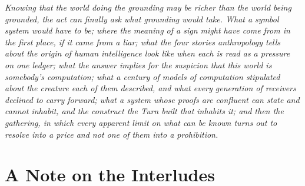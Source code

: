 \documentclass[12pt,openright,twoside]{book}
\theoremstyle{remark}
\theoremstyle{plain}
\theoremstyle{remark}
\theoremstyle{plain}
\theoremstyle{plain}
\begin{document}
\vspace{1em}
\begin{mdframed}[backgroundcolor=remarkgray, linecolor=gray!60,
                 linewidth=1pt, topline=false, rightline=false,
                 bottomline=false]
\small\itshape
Knowing that the world doing the grounding may be richer than the world
being grounded, the act can finally ask what grounding would take.
What a symbol system would have to be; where the meaning of a sign might
have come from in the first place, if it came from a liar; what the four
stories anthropology tells about the origin of human intelligence look like
when each is read as a pressure on one ledger; what the answer
implies for the suspicion that this world is somebody's computation; what a
century of
models of computation stipulated about the creature each of them
described, and what every generation of receivers declined to carry
forward; what a system whose proofs are confluent can state and cannot
inhabit, and the construct the Turn built that inhabits it; and then the
gathering, in which every apparent limit on what
can be known turns out to resolve into a price and not one of them into
a prohibition.
\end{mdframed}

\bigskip




\cleardoublepage
{}
{}
\chapter*{A Note on the Interludes}
\end{document}
